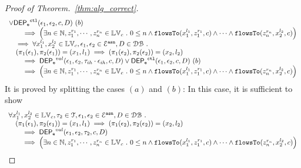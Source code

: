 \begin{proof}[Proof of Theorem.~\ref{thm:alg_correct}]
$$\begin{array}{l}
\lor
\mathsf{DEP_{\mathtt{e}}}^{\mathtt{{ctl}}}(\mathtt{\epsilon}_1, \mathtt{\epsilon}_2, c, D)  ~ (b)
  \\ \qquad \implies
   \Big(\exists  n \in \mathbb{N}, z_1^{r_1}, \cdots, z_n^{r_n} \in \mathbb{LV}_{{c}} ~.~ 0 \leq n
 \land \mathtt{flowsTo}(x_1^{l_1}, z_1^{r_1}, c) \land \cdots \land \mathtt{flowsTo}(z_n^{r_n}, {x}_2^{l_2}, c) \Big)
\\ \quad \implies
\forall {x}_1^{l_1}, {x}_2^{l_2} \in \mathbb{LV}_{{c}},
\mathtt{\epsilon}_1, \mathtt{\epsilon}_2 \in \mathcal{E}^{\mathtt{{asn}}}, D \in \mathcal{DB} ~.~
\\ \quad
(\pi_{1}{(\mathtt{\epsilon}_1)}, \pi_{2}{(\mathtt{\epsilon}_1)}) = ({x}_1, l_1)
\implies
(\pi_{1}{(\mathtt{\epsilon}_2)}, \pi_{2}{(\mathtt{\epsilon}_2)}) = ({x}_2, l_2)
 \\ \qquad \implies 
\mathsf{DEP_{\mathtt{e}}}^{val}(\mathtt{\epsilon}_1, \mathtt{\epsilon}_2, \mathtt{\tau}_{ih} \cdot \mathtt{\epsilon}_{ih}, c, D)
\lor
\mathsf{DEP_{\mathtt{e}}}^{\mathtt{{ctl}}}(\mathtt{\epsilon}_1, \mathtt{\epsilon}_2, c, D)  ~ (b)
  \\ \qquad \implies
   \Big(\exists  n \in \mathbb{N}, z_1^{r_1}, \cdots, z_n^{r_n} \in \mathbb{LV}_{{c}} ~.~ 0 \leq n
 \land \mathtt{flowsTo}(x_1^{l_1}, z_1^{r_1}, c) \land \cdots \land \mathtt{flowsTo}(z_n^{r_n}, {x}_2^{l_2}, c) \Big)
\end{array}
$$
%
It is proved by splitting the cases $(a)$ and $(b)$:
%
%
In this case, it is sufficient to show
 \[
\begin{array}{l}
\forall {x}_1^{l_1}, {x}_2^{l_2} \in \mathbb{LV}_{{c}}, \mathtt{\tau}_2 \in \mathcal{T}, 
\mathtt{\epsilon}_1, \mathtt{\epsilon}_2 \in \mathcal{E}^{\mathtt{{asn}}}, D \in \mathcal{DB} ~.~
\\ \quad
(\pi_{1}{(\mathtt{\epsilon}_1)}, \pi_{2}{(\mathtt{\epsilon}_1)}) = ({x}_1, l_1)
\implies
(\pi_{1}{(\mathtt{\epsilon}_2)}, \pi_{2}{(\mathtt{\epsilon}_2)}) = ({x}_2, l_2)
 \\ \qquad \implies 
\mathsf{DEP_{\mathtt{e}}}^{val}(\mathtt{\epsilon}_1, \mathtt{\epsilon}_2, \mathtt{\tau}_2, c, D)
 \\ \qquad \implies
   \Big(\exists  n \in \mathbb{N}, z_1^{r_1}, \cdots, z_n^{r_n} \in \mathbb{LV}_{{c}} ~.~ 0 \leq n
 \land \mathtt{flowsTo}(x_1^{l_1}, z_1^{r_1}, c) \land \cdots \land \mathtt{flowsTo}(z_n^{r_n}, {x}_2^{l_2}, c) \Big)
\end{array}
\]
%

\end{proof}
